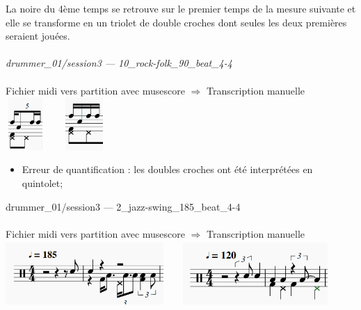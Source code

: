 La noire du 4ème temps se retrouve sur le premier temps de la mesure suivante et elle se transforme en un triolet de double croches dont seules les deux premières seraient jouées.\\\\
\textit{drummer\_01/session3 — 10\_rock-folk\_90\_beat\_4-4}\\\\
Fichier midi vers partition avec musescore $\Rightarrow$ Transcription manuelle\\
\includegraphics[height=20mm, width=15mm]{z_images/transcriptions_manuelles/0_prise_en_main/0_tests_drummer_01__session3/musescore_1.png}\ \ \ \ 
\includegraphics[height=20mm, width=15mm]{z_images/transcriptions_manuelles/0_prise_en_main/0_tests_drummer_01__session3/manuel_1.png}\\
\begin{itemize}
	\item Erreur de quantification : les doubles croches ont été interprétées en quintolet;\\
\end{itemize}
drummer\_01/session3 — 2\_jazz-swing\_185\_beat\_4-4\\\\
Fichier midi vers partition avec musescore $\Rightarrow$ Transcription manuelle\\
\includegraphics[height=25mm, width=60mm]{z_images/transcriptions_manuelles/0_prise_en_main/0_tests_drummer_01__session3/musescore_2.png}\ \ \ \ 
\includegraphics[height=25mm, width=55mm]{z_images/transcriptions_manuelles/0_prise_en_main/0_tests_drummer_01__session3/manuel_2.png}
